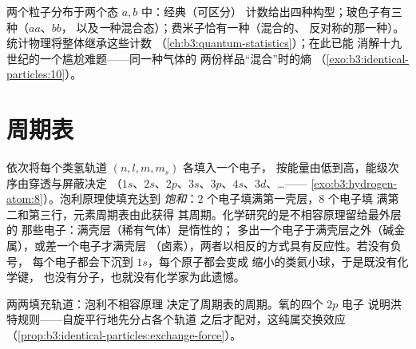 \begin{example}[不同的计数方式]\label{ex:b3:identical-particles:counting}
两个粒子分布于两个态 $a, b$ 中：经典（可区分）
计数给出四种构型；玻色子有三种（$aa$、$bb$，
以及\emph{一}种混合态）；费米子恰有一种（混合的、
反对称的那一种）。统计物理将整体继承这些计数
（\cref{ch:b3:quantum-statistics}）；在此已能
消解十九世纪的一个尴尬难题——同一种气体的
两份样品“混合”时的熵
（\cref{exo:b3:identical-particles:10}）。
\end{example}

\section{周期表}

\begin{proposition}[壳层，以及化学存在的原因]\label{prop:b3:identical-particles:periodic}
依次将每个类氢轨道 $(n, l, m, m_s)$ 各填入一个电子，
按能量由低到高，能级次序由穿透与屏蔽决定
（$1s$、$2s$、$2p$、$3s$、$3p$、$4s$、$3d$、\dots ——
\cref{exo:b3:hydrogen-atom:8}）。泡利原理使填充达到
\emph{饱和}：$2$ 个电子填满第一壳层，$8$ 个电子填
满第二和第三行，元素周期表由此获得
其周期。化学研究的是不相容原理留给最外层的
那些电子：满壳层（稀有气体）是惰性的；
多出一个电子于满壳层之外（碱金属），或差一个电子才满壳层
（卤素），两者以相反的方式具有反应性。若没有负号，
每个电子都会下沉到 $1s$，每个原子都会变成
缩小的类氦小球，于是既没有化学键，
也没有分子，也就没有化学家为此遗憾。
\end{proposition}
\admitted

\begin{omfigure}

{\small 两两填充轨道：泡利不相容原理
决定了周期表的周期。氧的四个 $2p$ 电子
说明洪特规则——自旋平行地先分占各个轨道
之后才配对，这纯属交换效应
（\cref{prop:b3:identical-particles:exchange-force}）。}
\end{omfigure}

